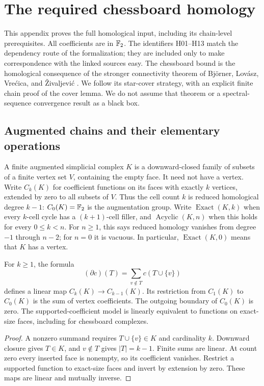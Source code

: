 \section{The required chessboard homology}\label{sec:topology}

This appendix proves the full homological input, including its chain-level
prerequisites. All coefficients are in \(\mathbb F_2\). The identifiers H01--H13
match the dependency route of the formalization; they are included only to
make correspondence with the linked sources easy. The chessboard bound is
the homological consequence of the stronger connectivity theorem of
Bj\"orner, Lov\'asz, Vre\'cica, and \v{Z}ivaljevi\'c
\cite[Theorem 1.1]{BLVZ94}. We follow its star-cover strategy, with an
explicit finite chain proof of the cover lemma. We do not assume that
theorem or a spectral-sequence convergence result as a black box.

\subsection{Augmented chains and their elementary operations}

A finite augmented simplicial complex \(K\) is a downward-closed family
of subsets of a finite vertex set \(V\), containing the empty face.
It need not have a vertex. Write \(C_k(K)\) for coefficient functions
on its faces with exactly \(k\) vertices, extended by zero to all subsets
of \(V\). Thus the cell count \(k\) is reduced homological degree
\(k-1\): \(C_0(K)=\mathbb F_2\) is the augmentation group.
Write \(\operatorname{Exact}(K,k)\) when every \(k\)-cell cycle has a
\((k+1)\)-cell filler, and \(\operatorname{Acyclic}(K,n)\) when this
holds for every \(0\le k<n\). For \(n\ge1\), this says reduced homology
vanishes from degree \(-1\) through \(n-2\); for \(n=0\) it is vacuous.
In particular, \(\operatorname{Exact}(K,0)\) means that \(K\) has a vertex.

\begin{proposition}\label{prop:h01}
For \(k\ge1\), the formula
\[
 (\partial c)(T)=\sum_{v\notin T}c(T\cup\{v\})
\]
defines a linear map \(C_k(K)\to C_{k-1}(K)\). Its restriction from
\(C_1(K)\) to \(C_0(K)\) is the sum of vertex coefficients.
The outgoing boundary of \(C_0(K)\) is zero.
The supported-coefficient model is linearly equivalent to functions on
exact-size faces, including for chessboard complexes.
\end{proposition}
\begin{proof}
A nonzero summand requires \(T\cup\{v\}\in K\) and cardinality \(k\).
Downward closure gives \(T\in K\), and \(v\notin T\) gives
\(|T|=k-1\). Finite sums are linear. At count zero every inserted face
is nonempty, so its coefficient vanishes. Restrict a supported function
to exact-size faces and invert by extension by zero. These maps are
linear and mutually inverse.
\end{proof}

